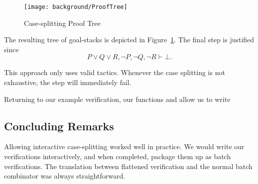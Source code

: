 \vspace{0.5cm}
\begin{minipage}{\linewidth}
  \footnotesize






\end{minipage}
\vspace{0.5cm}

\begin{figure}
\begin{center}
\texttt{[image: background/ProofTree]}
\end{center}
\caption{Case-splitting Proof Tree}
\label{fig:CaseProofTree}
\end{figure}

The resulting tree of goal-stacks is depicted in Figure~\ref{fig:CaseProofTree}. The final  step is justified since
\begin{displaymath}
P \vee Q \vee R, \neg P, \neg Q, \neg R \vdash \bot.
\end{displaymath}

This approach only uses valid tactics. Whenever the case splitting is not exhaustive, the  step will immediately fail.

Returning to our example verification, our functions  and  allow us to write

\vspace{0.5cm}
\begin{minipage}{\linewidth}
  \footnotesize






\end{minipage}
\vspace{0.5cm}

\subsection{Concluding Remarks}
Allowing interactive case-splitting worked well in practice. We would write our verifications interactively, and when completed, package them up as batch verifications. The translation between flattened verification and the normal batch  combinator was always straightforward.

